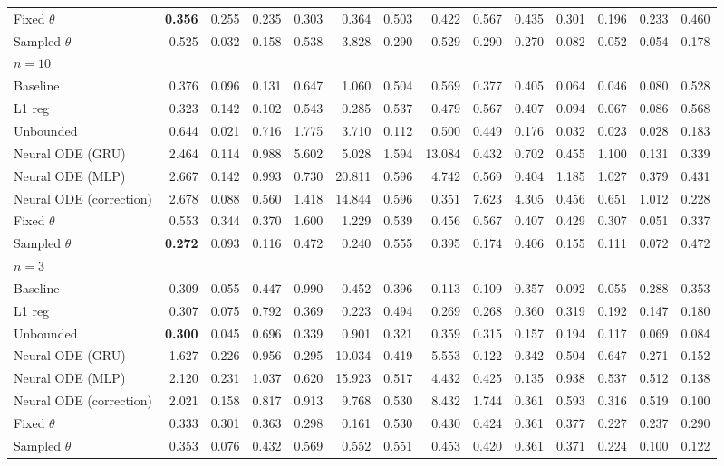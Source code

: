\begin{tabular}{lrrrrrrrrrrrrr}
Fixed $\theta$ & \textbf{0.356} & 0.255 & 0.235 & 0.303 & 0.364 & 0.503 & 0.422 & 0.567 & 0.435 & 0.301 & 0.196 & 0.233 & 0.460 \\
Sampled $\theta$ & 0.525 & 0.032 & 0.158 & 0.538 & 3.828 & 0.290 & 0.529 & 0.290 & 0.270 & 0.082 & 0.052 & 0.054 & 0.178 \\
\midrule
\multicolumn{14}{l}{\textbf{$n=10$}} \\
Baseline & 0.376 & 0.096 & 0.131 & 0.647 & 1.060 & 0.504 & 0.569 & 0.377 & 0.405 & 0.064 & 0.046 & 0.080 & 0.528 \\
L1 reg & 0.323 & 0.142 & 0.102 & 0.543 & 0.285 & 0.537 & 0.479 & 0.567 & 0.407 & 0.094 & 0.067 & 0.086 & 0.568 \\
Unbounded & 0.644 & 0.021 & 0.716 & 1.775 & 3.710 & 0.112 & 0.500 & 0.449 & 0.176 & 0.032 & 0.023 & 0.028 & 0.183 \\
Neural ODE (GRU) & 2.464 & 0.114 & 0.988 & 5.602 & 5.028 & 1.594 & 13.084 & 0.432 & 0.702 & 0.455 & 1.100 & 0.131 & 0.339 \\
Neural ODE (MLP) & 2.667 & 0.142 & 0.993 & 0.730 & 20.811 & 0.596 & 4.742 & 0.569 & 0.404 & 1.185 & 1.027 & 0.379 & 0.431 \\
Neural ODE (correction) & 2.678 & 0.088 & 0.560 & 1.418 & 14.844 & 0.596 & 0.351 & 7.623 & 4.305 & 0.456 & 0.651 & 1.012 & 0.228 \\
Fixed $\theta$ & 0.553 & 0.344 & 0.370 & 1.600 & 1.229 & 0.539 & 0.456 & 0.567 & 0.407 & 0.429 & 0.307 & 0.051 & 0.337 \\
Sampled $\theta$ & \textbf{0.272} & 0.093 & 0.116 & 0.472 & 0.240 & 0.555 & 0.395 & 0.174 & 0.406 & 0.155 & 0.111 & 0.072 & 0.472 \\
\midrule
\multicolumn{14}{l}{\textbf{$n=3$}} \\
Baseline & 0.309 & 0.055 & 0.447 & 0.990 & 0.452 & 0.396 & 0.113 & 0.109 & 0.357 & 0.092 & 0.055 & 0.288 & 0.353 \\
L1 reg & 0.307 & 0.075 & 0.792 & 0.369 & 0.223 & 0.494 & 0.269 & 0.268 & 0.360 & 0.319 & 0.192 & 0.147 & 0.180 \\
Unbounded & \textbf{0.300} & 0.045 & 0.696 & 0.339 & 0.901 & 0.321 & 0.359 & 0.315 & 0.157 & 0.194 & 0.117 & 0.069 & 0.084 \\
Neural ODE (GRU) & 1.627 & 0.226 & 0.956 & 0.295 & 10.034 & 0.419 & 5.553 & 0.122 & 0.342 & 0.504 & 0.647 & 0.271 & 0.152 \\
Neural ODE (MLP) & 2.120 & 0.231 & 1.037 & 0.620 & 15.923 & 0.517 & 4.432 & 0.425 & 0.135 & 0.938 & 0.537 & 0.512 & 0.138 \\
Neural ODE (correction) & 2.021 & 0.158 & 0.817 & 0.913 & 9.768 & 0.530 & 8.432 & 1.744 & 0.361 & 0.593 & 0.316 & 0.519 & 0.100 \\
Fixed $\theta$ & 0.333 & 0.301 & 0.363 & 0.298 & 0.161 & 0.530 & 0.430 & 0.424 & 0.361 & 0.377 & 0.227 & 0.237 & 0.290 \\
Sampled $\theta$ & 0.353 & 0.076 & 0.432 & 0.569 & 0.552 & 0.551 & 0.453 & 0.420 & 0.361 & 0.371 & 0.224 & 0.100 & 0.122 \\
\bottomrule
\end{tabular}
